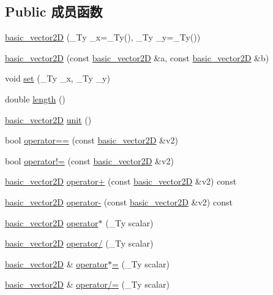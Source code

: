 \subsection*{Public 成员函数}
\begin{DoxyCompactItemize}
\item 
\hyperlink{structbasic__vector2_d_ad8b15c63d5ad6e86e1192ff820f53a67}{basic\+\_\+vector2D} (\+\_\+\+Ty \+\_\+x=\+\_\+\+Ty(), \+\_\+\+Ty \+\_\+y=\+\_\+\+Ty())
\item 
\hyperlink{structbasic__vector2_d_a348d37f966eeda40626112688649cb70}{basic\+\_\+vector2D} (const \hyperlink{structbasic__vector2_d}{basic\+\_\+vector2D} \&a, const \hyperlink{structbasic__vector2_d}{basic\+\_\+vector2D} \&b)
\item 
void \hyperlink{structbasic__vector2_d_a4085ab29a73798d9a1958eef96bf5f33}{set} (\+\_\+\+Ty \+\_\+x, \+\_\+\+Ty \+\_\+y)
\item 
double \hyperlink{structbasic__vector2_d_a9a5e3046e0e3c08caa6bc56e6cf2d270}{length} ()
\item 
\hyperlink{structbasic__vector2_d}{basic\+\_\+vector2D} \hyperlink{structbasic__vector2_d_aa4b24c577ef24c814370beebc22f3bb8}{unit} ()
\item 
bool \hyperlink{structbasic__vector2_d_a51f3108036d2f3df7a4d5da488717d71}{operator==} (const \hyperlink{structbasic__vector2_d}{basic\+\_\+vector2D} \&v2)
\item 
bool \hyperlink{structbasic__vector2_d_abd00075de4f4635651d57ede1800ad27}{operator!=} (const \hyperlink{structbasic__vector2_d}{basic\+\_\+vector2D} \&v2)
\item 
\hyperlink{structbasic__vector2_d}{basic\+\_\+vector2D} \hyperlink{structbasic__vector2_d_a0d01680904379f6984ee35cbe0ba3cf2}{operator+} (const \hyperlink{structbasic__vector2_d}{basic\+\_\+vector2D} \&v2) const
\item 
\hyperlink{structbasic__vector2_d}{basic\+\_\+vector2D} \hyperlink{structbasic__vector2_d_a7d335c93ec37013c5d4804bd721a04ac}{operator-\/} (const \hyperlink{structbasic__vector2_d}{basic\+\_\+vector2D} \&v2) const
\item 
\hyperlink{structbasic__vector2_d}{basic\+\_\+vector2D} \hyperlink{structbasic__vector2_d_a749249ddf6d61699428d2dee790dfd9a}{operator$\ast$} (\+\_\+\+Ty scalar)
\item 
\hyperlink{structbasic__vector2_d}{basic\+\_\+vector2D} \hyperlink{structbasic__vector2_d_a13a6172f8b5e7308964a372ed57a794b}{operator/} (\+\_\+\+Ty scalar)
\item 
\hyperlink{structbasic__vector2_d}{basic\+\_\+vector2D} \& \hyperlink{structbasic__vector2_d_aab570d392ff446a6e16f6ca648ee65c6}{operator$\ast$=} (\+\_\+\+Ty scalar)
\item 
\hyperlink{structbasic__vector2_d}{basic\+\_\+vector2D} \& \hyperlink{structbasic__vector2_d_ac608e28b6dc06bfeb28236e44bf850d0}{operator/=} (\+\_\+\+Ty scalar)
\end{DoxyCompactItemize}
